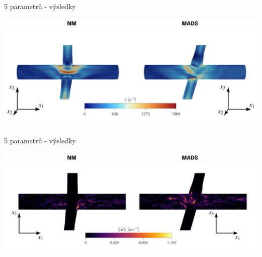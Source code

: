 \documentclass[aspectratio=169,xcolor=dvipsnames]{beamer}
\begin{document}
\begin{frame}{5 parametrů - výsledky}
	
	\addtocounter{framenumber}{-1}
	\begin{center}
	\includegraphics[width=0.95\linewidth, trim={0 0 0 0}, clip]{Images/popisky.png}
	\includegraphics[width=0.95\linewidth, trim={0 0 0 0}, clip]{Images/smyk.png}
	\end{center}	
\end{frame}
\begin{frame}{5 parametrů - výsledky}
	
	\addtocounter{framenumber}{-1}
	\begin{center}
		\includegraphics[width=0.95\linewidth, trim={0 0 0 0}, clip]{Images/popisky.png}
		\includegraphics[width=0.99\linewidth, trim={0 0 0 0}, clip]{Images/fluc.png}
	\end{center}	
\end{frame}
\end{document}
